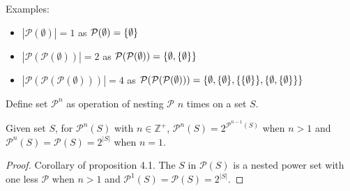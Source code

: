 Examples:
\begin{itemize}
    \item \(|\mathcal{P}(\emptyset)|=1\) as \(\mathcal{P}(\emptyset)=\{\emptyset\}\)
    \item \(|\mathcal{P}(\mathcal{P}(\emptyset))|=2\) as \(\mathcal{P}(\mathcal{P}(\emptyset))=\{\emptyset,\{\emptyset\}\}\)
    \item \(|\mathcal{P}(\mathcal{P}(\mathcal{P}(\emptyset)))|=4\) as \(\mathcal{P}(\mathcal{P}(\mathcal{P}(\emptyset)))=\{\emptyset,\{\emptyset\},\{\{\emptyset\}\},\{\emptyset,\{\emptyset\}\}\}\)
\end{itemize}

\bigskip

Define set \(\mathcal{P}^n\) as operation of nesting \(\mathcal{P}\) \(n\) times on a set \(S\).
\begin{proposition} 
    Given set \(S\), for \(\mathcal{P}^n(S)\) with \(n\in\mathbb{Z}^+\), \(\mathcal{P}^n(S)=2^{\mathcal{P}^{n-1}(S)}\) when \(n>1\) and \(\mathcal{P}^n(S)=\mathcal{P}(S)=2^{|S|}\) when \(n=1\).
\end{proposition}
\begin{proof}
    Corollary of proposition 4.1. The \(S\) in \(\mathcal{P}(S)\) is a nested power set with one less \(\mathcal{P}\) when \(n>1\) and \(\mathcal{P}^1(S)=\mathcal{P}(S)=2^{|S|}\).
\end{proof}

